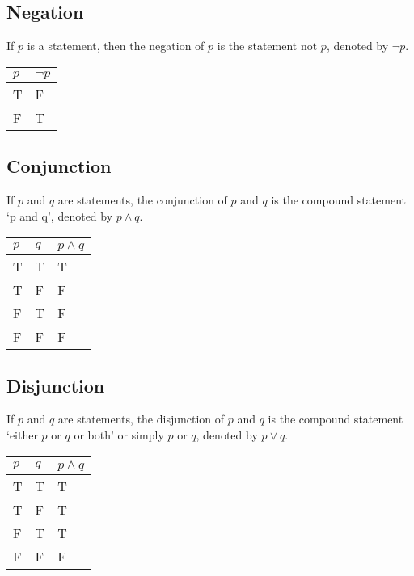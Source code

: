 \subsection*{Negation}
If $p$ is a statement, then the negation of $p$ is the statement not $p$, denoted by $¬p$. 
\begin{table}[H]
    \centering
    \begin{tabular}{C{0.1\textwidth} C{0.1\textwidth}}
        \textbf{$p$} & \textbf{$¬p$}\\
        \hline
        \hline
        T & F \\
        \hline
        F & T \\
        \hline
    \end{tabular}
\end{table}

\subsection*{Conjunction}
If $p$ and $q$ are statements, the conjunction of $p$ and $q$ is the compound statement `p and q', denoted by $p \wedge q$. 
\begin{table}[H]
    \centering
    \begin{tabular}{C{0.1\textwidth} C{0.1\textwidth} C{0.1\textwidth}}
        $p$ & $q$ & $p \wedge q$\\
        \hline
        \hline
        T & T & T\\
        \hline
        T & F & F \\
        \hline
        F & T & F \\
        \hline
        F & F & F\\
        \hline
    \end{tabular}
\end{table}

\subsection*{Disjunction}
If $p$ and $q$ are statements, the disjunction of $p$ and $q$ is the compound statement `either $p$ or $q$ or both' or simply $p$ or $q$, denoted by $p \vee q$.
\begin{table}[H]
    \centering
    \begin{tabular}{C{0.1\textwidth} C{0.1\textwidth} C{0.1\textwidth}}
        $p$ & $q$ & $p \wedge q$\\
        \hline
        \hline
        T & T & T\\
        \hline
        T & F & T \\
        \hline
        F & T & T \\
        \hline
        F & F & F\\
        \hline
    \end{tabular}
\end{table}

